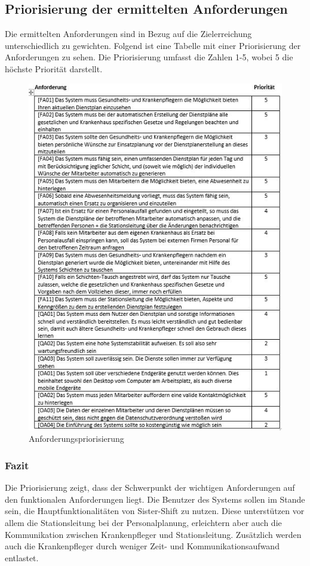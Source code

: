 \documentclass[11pt,
paper=a4,
bibtotocnumbered,	  %
liststotocnumbered,  %
DIV=calc,		  %
tablecaptionabove,	  %
headinclude,
]{article}
\begin{document}
\subsection{Priorisierung der ermittelten Anforderungen}
Die ermittelten Anforderungen sind in Bezug auf die Zielerreichung unterschiedlich zu gewichten. Folgend ist eine Tabelle mit einer Priorisierung der Anforderungen zu sehen. Die Priorisierung umfasst die Zahlen 1-5, wobei 5 die höchste Priorität darstellt.
\begin{figure}
\includegraphics[scale=1]{Bilder/Tanforderungen.png}
\caption{Anforderungspriorisierung}
\end{figure}
\subsubsection{Fazit}
Die Priorisierung zeigt, dass der Schwerpunkt der wichtigen Anforderungen auf den funktionalen Anforderungen liegt. Die Benutzer des Systems sollen im Stande sein, die Hauptfunktionalitäten von Sister-Shift zu nutzen. Diese unterstützen vor allem die Stationsleitung bei der Personalplanung, erleichtern aber auch die Kommunikation zwischen Krankenpfleger und Stationsleitung. Zusätzlich werden auch die Krankenpfleger durch weniger Zeit- und Kommunikationsaufwand entlastet.
\end{document}
